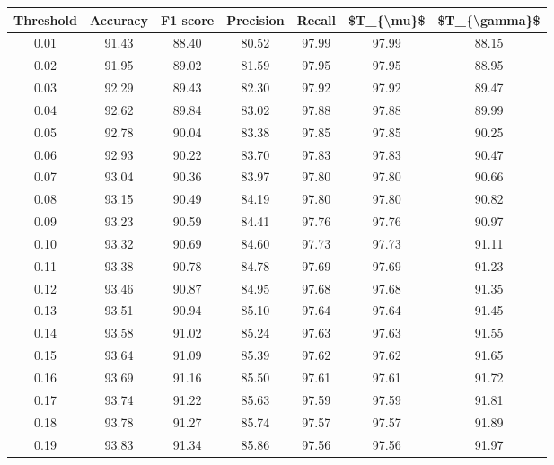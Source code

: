 \begin{tabular}{|c|c|c|c|c|c|c|}
\hline
 Threshold &  Accuracy &  F1 score &  Precision &  Recall &  \$T\_\{\textbackslash mu\}\$ &  \$T\_\{\textbackslash gamma\}\$ \\
\hline
      0.01 &     91.43 &     88.40 &      80.52 &   97.99 &      97.99 &         88.15 \\
      0.02 &     91.95 &     89.02 &      81.59 &   97.95 &      97.95 &         88.95 \\
      0.03 &     92.29 &     89.43 &      82.30 &   97.92 &      97.92 &         89.47 \\
      0.04 &     92.62 &     89.84 &      83.02 &   97.88 &      97.88 &         89.99 \\
      0.05 &     92.78 &     90.04 &      83.38 &   97.85 &      97.85 &         90.25 \\
      0.06 &     92.93 &     90.22 &      83.70 &   97.83 &      97.83 &         90.47 \\
      0.07 &     93.04 &     90.36 &      83.97 &   97.80 &      97.80 &         90.66 \\
      0.08 &     93.15 &     90.49 &      84.19 &   97.80 &      97.80 &         90.82 \\
      0.09 &     93.23 &     90.59 &      84.41 &   97.76 &      97.76 &         90.97 \\
      0.10 &     93.32 &     90.69 &      84.60 &   97.73 &      97.73 &         91.11 \\
      0.11 &     93.38 &     90.78 &      84.78 &   97.69 &      97.69 &         91.23 \\
      0.12 &     93.46 &     90.87 &      84.95 &   97.68 &      97.68 &         91.35 \\
      0.13 &     93.51 &     90.94 &      85.10 &   97.64 &      97.64 &         91.45 \\
      0.14 &     93.58 &     91.02 &      85.24 &   97.63 &      97.63 &         91.55 \\
      0.15 &     93.64 &     91.09 &      85.39 &   97.62 &      97.62 &         91.65 \\
      0.16 &     93.69 &     91.16 &      85.50 &   97.61 &      97.61 &         91.72 \\
      0.17 &     93.74 &     91.22 &      85.63 &   97.59 &      97.59 &         91.81 \\
      0.18 &     93.78 &     91.27 &      85.74 &   97.57 &      97.57 &         91.89 \\
      0.19 &     93.83 &     91.34 &      85.86 &   97.56 &      97.56 &         91.97 \\

\end{tabular}
